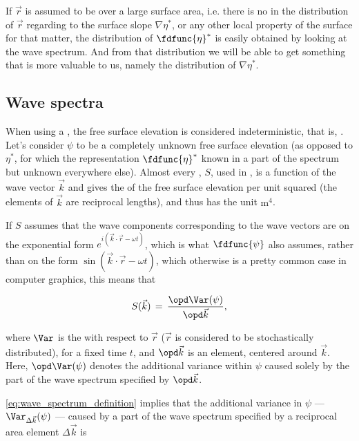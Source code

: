 {If $\vec{r}$ is assumed to be  over a large surface area, i.e. there is no \bias in the distribution of $\vec{r}$ regarding to the surface slope $\nabla\eta^*$, or any other local property of the surface for that matter, the distribution of $\fdfunc{\eta}^*$ is easily obtained by looking at the wave spectrum. And from that distribution we will be able to get something that is more valuable to us, namely the distribution of $\nabla\eta^*$.

\subsection{Wave spectra}

When using a , the free surface elevation is considered indeterministic, that is, \stochastic. Let's consider $\psi$ to be a completely unknown free surface elevation (as opposed to $\eta^*$, for which the  representation $\fdfunc{\eta}^*$ known in a part of the spectrum but unknown everywhere else). Almost every , $S$, used in , is a function of the wave vector $\vec{k}$ and gives the \variance of the free surface elevation per unit  squared (the elements of $\vec{k}$ are reciprocal lengths), and thus has the unit $\text{m}^4$. 

If $S$ assumes that the wave components corresponding to the wave vectors are on the exponential form $e^{i(\vec{k}\cdot\vec{r}-\omega t)}$, which is what $\fdfunc{\psi}$ also assumes, rather than on the \sinusoidal form $\sin(\vec{k}\cdot\vec{r}-\omega t)$, which otherwise is a pretty common case in computer graphics, this means that

\begin{equation} \label{eq:wave_spectrum_definition}
S(\vec{k}) \,=\, \frac{\opd \Var(\psi)}{\opd\vec{k}},
\end{equation}

where $\Var$ is the  with respect to $\vec{r}$ ($\vec{r}$ is considered to be stochastically distributed), for a fixed time $t$, and $\opd\vec{k}$ is an \infinitesimal {} element, centered around $\vec{k}$. Here, $\opd\Var(\psi)$ denotes the additional variance within $\psi$ caused solely by the part of the wave spectrum specified by $\opd\vec{k}$.

\eqref{eq:wave_spectrum_definition} implies that the additional variance in $\psi$ --- $\Var_{\Delta\vec{k}}(\psi)$ --- caused by a part of the wave spectrum specified by a reciprocal area element $\Delta\vec{k}$ is

}
